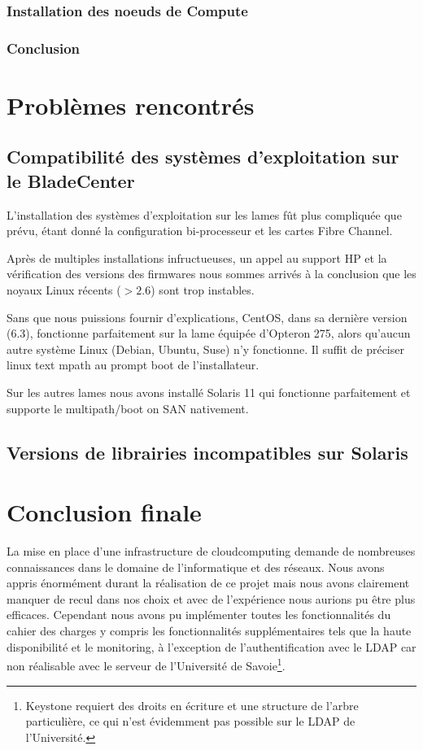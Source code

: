 \documentclass[a4paper,oneside]{report}
\begin{document}
\subsection{Installation des noeuds de Compute}



\subsection{Conclusion}


\chapter{Problèmes rencontrés}
\section{Compatibilité des systèmes d'exploitation sur le BladeCenter}
\label{sec:compatblade}
L'installation des systèmes d'exploitation sur les lames fût plus compliquée que prévu, étant donné la configuration bi-processeur et les cartes Fibre Channel.

Après de multiples installations infructueuses, un appel au support HP et la vérification des versions des firmwares nous sommes arrivés à la conclusion que les noyaux Linux récents ($ > 2.6 $) sont trop instables.

Sans que nous puissions fournir d'explications, CentOS, dans sa dernière version (6.3), fonctionne parfaitement sur la lame équipée d'Opteron 275, alors qu'aucun autre système Linux (Debian, Ubuntu, Suse) n'y fonctionne.
Il suffit de préciser linux text mpath au prompt boot de l'installateur.

Sur les autres lames nous avons installé Solaris 11 qui fonctionne parfaitement et supporte le multipath/boot on SAN nativement.

\section{Versions de librairies incompatibles sur Solaris}
\label{sec:libsolaris}

\chapter{Conclusion finale}
La mise en place d'une infrastructure de \gls{cloudcomputing} demande de nombreuses connaissances dans le domaine de l'informatique et des réseaux.
Nous avons appris énormément durant la réalisation de ce projet mais nous avons clairement manquer de recul dans nos choix et avec de l'expérience nous aurions pu être plus efficaces.\newline
Cependant nous avons pu implémenter toutes les fonctionnalités du cahier des charges y compris les fonctionnalités supplémentaires tels que la haute disponibilité et le monitoring, à l'exception de l'authentification avec le LDAP car non réalisable avec le serveur de l'Université de Savoie\footnote{Keystone requiert des droits en écriture et une structure de l'arbre particulière, ce qui n'est évidemment pas possible sur le LDAP de l'Université.}.
\end{document}
